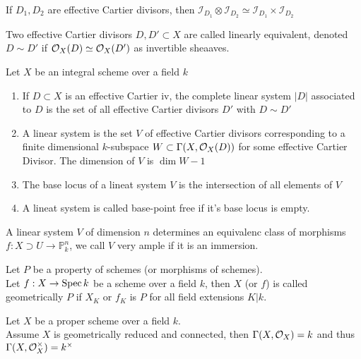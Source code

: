 \documentclass[../main.tex]{subfiles}
\begin{document}
If $D_1,D_2$ are effective Cartier divisors, then $ \mathcal{I}_{D_1} \otimes \mathcal{I}_{D_2} \simeq \mathcal{I}_{D_1} \times \mathcal{I}_{D_2} $ 
\begin{defn}
	Two effective Cartier divisors $D,D' \subset X$ are called linearly equivalent, denoted $D \sim D'$ if $\mathcal{O}_X( D) \simeq \mathcal{O}_X( D') $ as invertible sheaaves.
\end{defn}
\begin{defn}
	Let $X$ be an integral scheme over a field $k$ 
	\begin{enumerate}
	\item If $D \subset X$ is an effective Cartier iv, the complete linear system $|D|$ associated to $D$ is the set of all effective Cartier divisors $D'$ with $D\sim D'$
	\item A linear system is the set $V$  of effective Cartier divisors corresponding to a finite dimensional $k$-subspace $W \subset \Gamma( X,\mathcal{O}_X( D) ) $ for some effective Cartier Divisor.
		The dimension of $V$ is $\dim W -1$ 
	\item The base locus of a lineat system $V$ is the intersection of all elements of $V$ 
	\item A lineat system is called base-point free if it's base locus is empty.
	\end{enumerate}
\end{defn}
\begin{rmq}
A linear system $V$ of dimension $n$ determines an equivalenc class of morphisms $f:X\supset U \to \mathbb{P}^{n}_k$, we call $V$ very ample if it is an immersion.
\end{rmq}
\begin{defn}
	Let $P$ be a property of schemes (or morphisms of schemes).\\
	Let $f:X\to \operatorname{Spec} k$ be a scheme over a field $k$, then $X$ (or $f$) is called geometrically $P$ if $X_K$ or $f_K$ is $P$ for all field extensions $K|k$.
\end{defn}
\begin{propo}
Let $X$ be a proper scheme over a field $k$.\\
Assume $X$ is geometrically reduced and connected, then $\Gamma( X,\mathcal{O}_X) = k$ and thus $\Gamma( X,\mathcal{O}_X^{\times}) = k^{\times}$ 
\end{propo}
\end{document}
